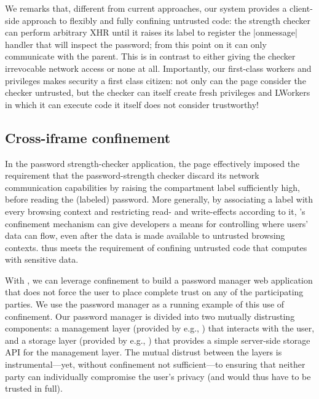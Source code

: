 We remarks that, different from current approaches, our system
provides a client-side approach to flexibly and fully confining
untrusted code:
%
the strength checker can perform arbitrary XHR until it raises its
label to register the \js|onmessage| handler that will inspect the
password; from this point on it can only communicate with the parent.
%
This is in contrast to either giving the checker irrevocable network
access or none at all.
%
Importantly, our first-class workers and privileges makes security a
first class citizen: not only can the page consider the checker
untrusted, but the checker can itself create fresh privileges and 
LWorkers in which it can execute code it itself does not consider
trustworthy!

\subsection{Cross-iframe confinement}
\label{sec:system:iframe}

In the password strength-checker application, the 
page effectively imposed the requirement that the password-strength
checker discard its network communication capabilities by raising the
compartment label sufficiently high, before reading the (labeled)
password.
%
More generally, by associating a label with every browsing context and
restricting read- and write-effects according to it, \sys{}'s
confinement mechanism can give developers a means for controlling
where users' data can flow, even after the data is made available to
untrusted browsing contexts. \sys{} thus meets the requirement of
confining untrusted code that computes with sensitive data.

%
With \sys{}, we can leverage confinement to build a password manager
web application that does not force the user to place complete trust on 
any of the participating parties. We use the password manager as a
running example of this use of confinement.
%
Our password manager is divided into two mutually distrusting
components: a management layer (provided by e.g., )
that interacts with the user, 
and a storage layer (provided by e.g., ) that provides a
simple
server-side storage API for the
management layer.
%
The mutual distrust between the layers is instrumental---yet, without
confinement not sufficient---to ensuring that neither party can
individually compromise the user's privacy (and would thus have to be
trusted in full).
%

